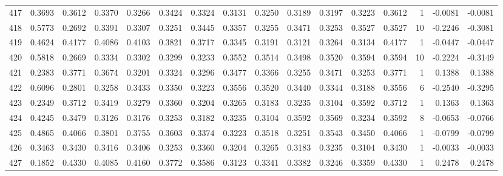 \begin{tabular}{lrrrrrrrrrrrrrrr}
417 &      0.3693 &  0.3612 &  0.3370 &  0.3266 &  0.3424 &  0.3324 &  0.3131 &  0.3250 &  0.3189 &  0.3197 &   0.3223 &     0.3612 &      1 &                   -0.0081 &                    -0.0081 \\
418 &      0.5773 &  0.2692 &  0.3391 &  0.3307 &  0.3251 &  0.3445 &  0.3357 &  0.3255 &  0.3471 &  0.3253 &   0.3527 &     0.3527 &     10 &                   -0.2246 &                    -0.3081 \\
419 &      0.4624 &  0.4177 &  0.4086 &  0.4103 &  0.3821 &  0.3717 &  0.3345 &  0.3191 &  0.3121 &  0.3264 &   0.3134 &     0.4177 &      1 &                   -0.0447 &                    -0.0447 \\
420 &      0.5818 &  0.2669 &  0.3334 &  0.3302 &  0.3299 &  0.3233 &  0.3552 &  0.3514 &  0.3498 &  0.3520 &   0.3594 &     0.3594 &     10 &                   -0.2224 &                    -0.3149 \\
421 &      0.2383 &  0.3771 &  0.3674 &  0.3201 &  0.3324 &  0.3296 &  0.3477 &  0.3366 &  0.3255 &  0.3471 &   0.3253 &     0.3771 &      1 &                    0.1388 &                     0.1388 \\
422 &      0.6096 &  0.2801 &  0.3258 &  0.3433 &  0.3350 &  0.3223 &  0.3556 &  0.3520 &  0.3440 &  0.3344 &   0.3188 &     0.3556 &      6 &                   -0.2540 &                    -0.3295 \\
423 &      0.2349 &  0.3712 &  0.3419 &  0.3279 &  0.3360 &  0.3204 &  0.3265 &  0.3183 &  0.3235 &  0.3104 &   0.3592 &     0.3712 &      1 &                    0.1363 &                     0.1363 \\
424 &      0.4245 &  0.3479 &  0.3126 &  0.3176 &  0.3253 &  0.3182 &  0.3235 &  0.3104 &  0.3592 &  0.3569 &   0.3234 &     0.3592 &      8 &                   -0.0653 &                    -0.0766 \\
425 &      0.4865 &  0.4066 &  0.3801 &  0.3755 &  0.3603 &  0.3374 &  0.3223 &  0.3518 &  0.3251 &  0.3543 &   0.3450 &     0.4066 &      1 &                   -0.0799 &                    -0.0799 \\
426 &      0.3463 &  0.3430 &  0.3416 &  0.3406 &  0.3253 &  0.3360 &  0.3204 &  0.3265 &  0.3183 &  0.3235 &   0.3104 &     0.3430 &      1 &                   -0.0033 &                    -0.0033 \\
427 &      0.1852 &  0.4330 &  0.4085 &  0.4160 &  0.3772 &  0.3586 &  0.3123 &  0.3341 &  0.3382 &  0.3246 &   0.3359 &     0.4330 &      1 &                    0.2478 &                     0.2478 \\

\end{tabular}
